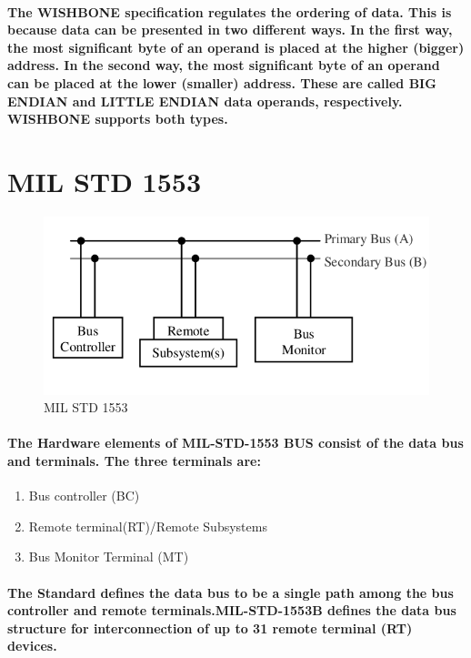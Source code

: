 \documentclass[12pt,a4paper]{report}
\begin{document}
\paragraph{\textrm{\textmd {The WISHBONE specification regulates the ordering of data. This is because data can be presented in two different ways. In the first way, the most significant byte of an operand is placed
			at the higher (bigger) address. In the second way, the most significant byte of an operand can be
			placed at the lower (smaller) address. These are called BIG ENDIAN and LITTLE ENDIAN
			data operands, respectively. WISHBONE supports both types.  }}}
\section{MIL STD 1553}
\begin{figure}[h]
	\centering
	\includegraphics[scale=.4]{1553.png}
	\caption{MIL STD 1553}
	\label{fig:1553}
\end{figure}
\paragraph{\textrm{\textmd{The Hardware elements of	MIL-STD-1553 BUS consist of the data bus and terminals. The three terminals are:}}}
\begin{enumerate}
	\item Bus controller (BC)
	\item Remote terminal(RT)/Remote Subsystems
	\item Bus Monitor Terminal (MT)
\end{enumerate} 
\paragraph{\textrm{\textmd{The Standard defines the data bus to be a single path among the bus controller and remote terminals.MIL-STD-1553B defines the data bus structure for interconnection of up to 31 remote terminal (RT) devices.}}}
\end{document}

